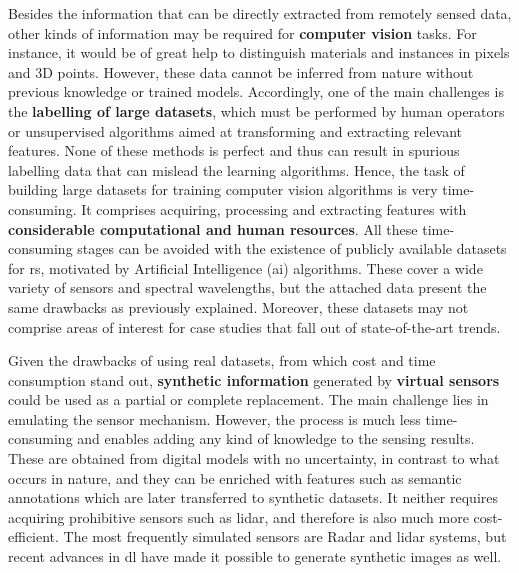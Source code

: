Besides the information that can be directly extracted from remotely sensed data, other kinds of information may be required for \textbf{computer vision} tasks. For instance, it would be of great help to distinguish materials and instances in pixels and 3D points. However, these data cannot be inferred from nature without previous knowledge or trained models. Accordingly, one of the main challenges is the \textbf{labelling of large datasets}, which must be performed by human operators \cite{li_image_2021, basu_deepsat_2015} or unsupervised algorithms aimed at transforming and extracting relevant features. None of these methods is perfect and thus can result in spurious labelling data that can mislead the learning algorithms. Hence, the task of building large datasets for training computer vision algorithms is very time-consuming. It comprises acquiring, processing and extracting features with \textbf{considerable computational and human resources}. All these time-consuming stages can be avoided with the existence of publicly available datasets for \acrshort{rs}, motivated by Artificial Intelligence (\acrshort{ai}) algorithms. These cover a wide variety of sensors and spectral wavelengths, but the attached data present the same drawbacks as previously explained. Moreover, these datasets may not comprise areas of interest for case studies that fall out of state-of-the-art trends. 


Given the drawbacks of using real datasets, from which cost and time consumption stand out, \textbf{synthetic information} generated by \textbf{virtual sensors} could be used as a partial or complete replacement. The main challenge lies in emulating the sensor mechanism. However, the process is much less time-consuming and enables adding any kind of knowledge to the sensing results. These are obtained from digital models with no uncertainty, in contrast to what occurs in nature, and they can be enriched with features such as semantic annotations which are later transferred to synthetic datasets. It neither requires acquiring prohibitive sensors such as \acrshort{lidar}, and therefore is also much more cost-efficient. The most frequently simulated sensors are Radar and \acrshort{lidar} systems, but recent advances in \acrshort{dl} have made it possible to generate synthetic images as well. 

